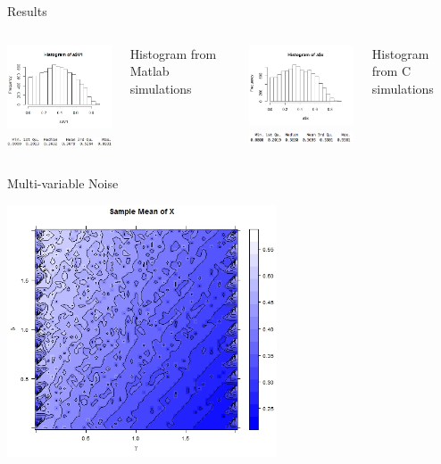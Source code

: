 \begin{frame}{Results}
 

  \begin{columns}[t]
    \includegraphics[width=6cm]{img/shrimpHistMATLAB} \\
		\includegraphics[width=5.5cm]{img/histSummML}
    \begin{center} Histogram from Matlab simulations \end{center}
    \includegraphics[width=6cm]{img/Rplot} \\
		\includegraphics[width=5.5cm]{img/sumAMAN}
    \begin{center} Histogram from C simulations \end{center}
  \end{columns}
\end{frame}



\begin{frame}{Multi-variable Noise}
\begin{center} 
	\includegraphics[width=8cm]{img/RplotMultiNoiseContourX} 
\end{center}
\end{frame}


